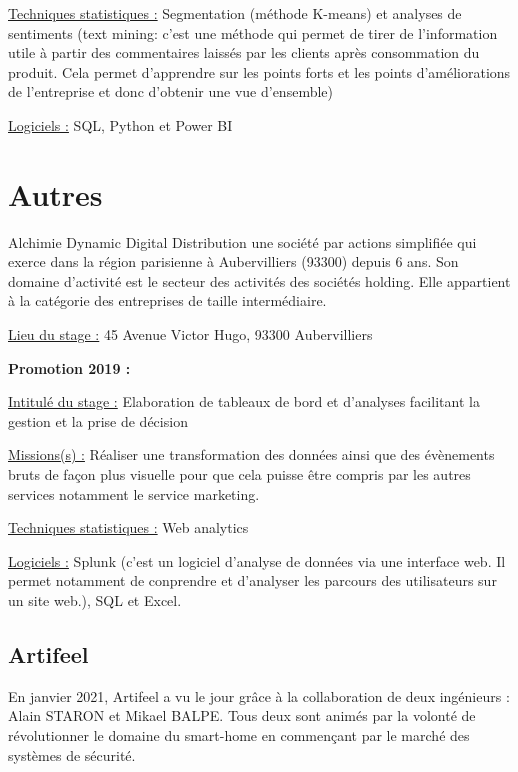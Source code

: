 \documentclass[
  letterpaper,
  DIV=11,
  numbers=noendperiod]{scrreprt}
\begin{document}
\uline{Techniques statistiques :} Segmentation (méthode K-means) et
analyses de sentiments (text mining: c'est une méthode qui permet de
tirer de l'information utile à partir des commentaires laissés par les
clients après consommation du produit. Cela permet d'apprendre sur les
points forts et les points d'améliorations de l'entreprise et donc
d'obtenir une vue d'ensemble)

\uline{Logiciels :} SQL, Python et Power BI


\hypertarget{autres}{%
\chapter{Autres}\label{autres}}

Alchimie Dynamic Digital Distribution une société par actions simplifiée
qui exerce dans la région parisienne à Aubervilliers (93300) depuis 6
ans. Son domaine d'activité est le secteur des activités des sociétés
holding. Elle appartient à la catégorie des entreprises de taille
intermédiaire.

\uline{Lieu du stage :} 45 Avenue Victor Hugo, 93300 Aubervilliers

\textbf{Promotion 2019 :}

\uline{Intitulé du stage :} Elaboration de tableaux de bord et
d'analyses facilitant la gestion et la prise de décision

\uline{Missions(s) :} Réaliser une transformation des données ainsi que
des évènements bruts de façon plus visuelle pour que cela puisse être
compris par les autres services notamment le service marketing.

\uline{Techniques statistiques :} Web analytics

\uline{Logiciels :} Splunk (c'est un logiciel d'analyse de données via
une interface web. Il permet notamment de conprendre et d'analyser les
parcours des utilisateurs sur un site web.), SQL et Excel.

\hypertarget{artifeel}{%
\section{\texorpdfstring{\textbf{Artifeel}}{Artifeel}}\label{artifeel}}

En janvier 2021, Artifeel a vu le jour grâce à la collaboration de deux
ingénieurs : Alain STARON et Mikael BALPE. Tous deux sont animés par la
volonté de révolutionner le domaine du smart-home en commençant par le
marché des systèmes de sécurité.
\end{document}
